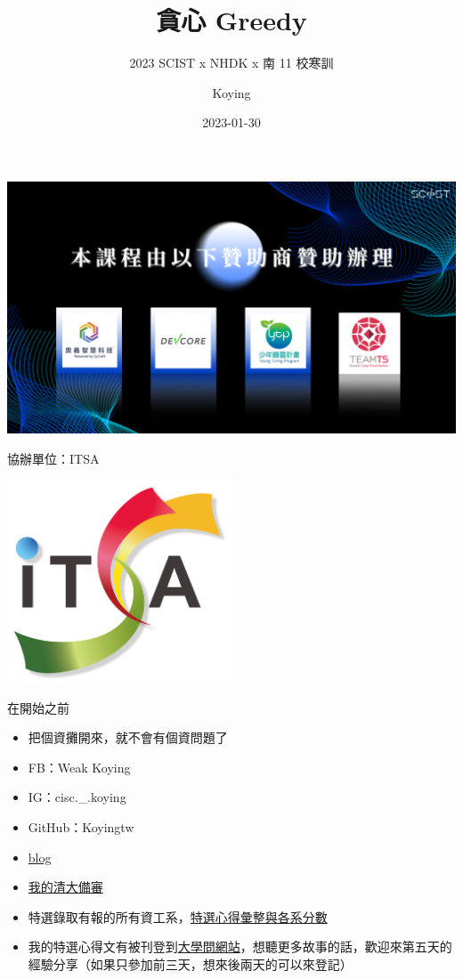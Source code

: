 \documentclass[aspectratio=169]{beamer}
\title{貪心 Greedy}
\subtitle{2023 SCIST x NHDK x 南 11 校寒訓}
\author{Koying}
\date{2023-01-30}
\begin{document}
    \begin{frame}
        \titlepage
    \end{frame}

    \begin{frame}
        \includegraphics[width=\textwidth]{img/SCIST_Sponser.png}
    \end{frame}

    \begin{frame}{協辦單位：ITSA}
        \begin{center}
            \includegraphics[width=0.5\textwidth]{img/ITSA.png}
        \end{center}
    \end{frame}

    \begin{frame}{在開始之前}
        \begin{itemize}
            \item<1-> 把個資攤開來，就不會有個資問題了
            \item<2-> FB：Weak Koying
            \item<2-> IG：cisc.\_.koying
            \item<2-> GitHub：Koyingtw
            \item<2-> \href{https://koyingtw.github.io/}{blog}
            \item<2-> \href{https://github.com/Koyingtw/spec-share}{我的清大備審}
            \item<2-> 特選錄取有報的所有資工系，\href{https://koyingtw.github.io/2022/10/31/特選心得/}{特選心得彙整與各系分數}
            \item<2-> 我的特選心得文有被刊登到\href{https://www.unews.com.tw/News/Info/6066}{大學問網站}，想聽更多故事的話，歡迎來第五天的經驗分享（如果只參加前三天，想來後兩天的可以來登記）
        \end{itemize}
    \end{frame}
\end{document}
